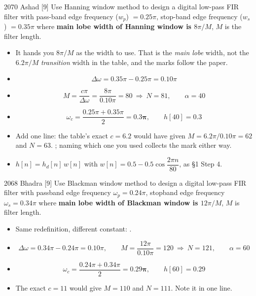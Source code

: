 \begin{asked}{2070 Ashad \textperiodcentered{} [9]}
Use Hanning window method to design a digital low-pass FIR filter with pass-band edge
frequency ($w_p$) $=0.25\pi$, stop-band edge frequency ($w_s$) $=0.35\pi$ where
\textbf{main lobe width of Hanning window is $8\pi/M$}, $M$ is the filter length.
\end{asked}

\begin{itemize}
  \item {} It hands you $8\pi/M$ as
        the width to use. That is the \emph{main lobe} width, not the $6.2\pi/M$
        \emph{transition} width in the table, and the marks follow the paper.
  \item[] \[ \Delta\omega=0.35\pi-0.25\pi=0.10\pi \]
  \item[] \[ M=\frac{c\pi}{\Delta\omega}=\frac{8\pi}{0.10\pi}=80
             \ \Rightarrow\ \boxed{N=81},\qquad \alpha=40 \]
  \item[] \[ \omega_c=\frac{0.25\pi+0.35\pi}{2}=\mathbf{0.3\pi},\qquad h[40]=0.3 \]
  \item Add one line: the table's exact $c=6.2$ would have given
        $M=6.2\pi/0.10\pi=62$ and $N=63$. ;
        naming which one you used collects the mark either way.
  \item $h[n]=h_d[n]\,w[n]$ with $w[n]=0.5-0.5\cos\dfrac{2\pi n}{80}$, as \S1 Step 4.
\end{itemize}

\begin{asked}{2068 Bhadra \textperiodcentered{} [9]}
Use Blackman window method to design a digital low-pass FIR filter with passband edge
frequency $\omega_p=0.24\pi$, stopband edge frequency $\omega_s=0.34\pi$ where
\textbf{main lobe width of Blackman window is $12\pi/M$}, $M$ is filter length.
\end{asked}

\begin{itemize}
  \item Same redefinition, different constant: .
  \item[] \[ \Delta\omega=0.34\pi-0.24\pi=0.10\pi,\qquad
             M=\frac{12\pi}{0.10\pi}=120\ \Rightarrow\ \boxed{N=121},\qquad \alpha=60 \]
  \item[] \[ \omega_c=\frac{0.24\pi+0.34\pi}{2}=\mathbf{0.29\pi},\qquad h[60]=0.29 \]
  \item The exact $c=11$ would give $M=110$ and $N=111$. Note it in one line.
\end{itemize}

